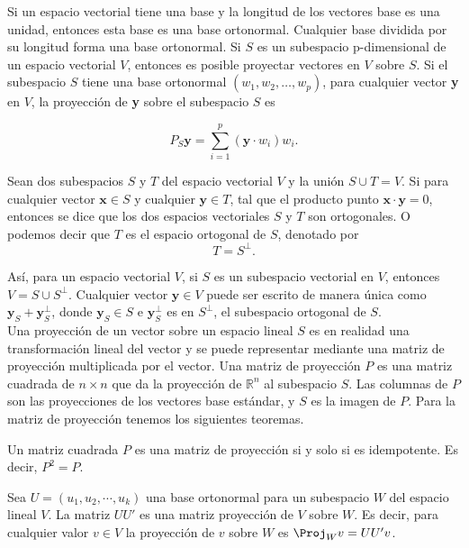 Si un espacio vectorial tiene una base y la longitud de los vectores base es una unidad, entonces esta base es una base ortonormal. Cualquier base dividida por su longitud forma una base ortonormal. Si $S$ es un subespacio p-dimensional de un espacio vectorial $V$, entonces es posible proyectar vectores en $V$ sobre $S$. Si el subespacio $S$ tiene una base ortonormal $(w_1, w_2, \ldots , w_p)$, para cualquier vector \textbf{y} en $V$, la proyección de \textbf{y} sobre el subespacio $S$ es

\begin{equation}
    P_{S}\textbf{y}=\sum_{i=1}^p (\textbf{y}\cdot w_i)w_i.
\end{equation}

Sean dos subespacios $S$ y $T$ del espacio vectorial $V$ y la unión $S\cup T = V$. Si para cualquier vector $\textbf{x}\in S$ y cualquier $\textbf{y}\in T$, tal que el producto punto $\textbf{x}\cdot \textbf{y}=0$, entonces se dice que los dos espacios vectoriales $S$ y $T$ son ortogonales. O podemos decir que $T$ es el espacio ortogonal de $S$, denotado por 
$$T=S^{\perp}.$$

Así, para un espacio vectorial $V$, si $S$ es un subespacio vectorial en $V$, entonces $V=S\cup S^{\perp}$. Cualquier vector $\textbf{y}\in V$ puede ser escrito de manera única como $\textbf{y}_{S}+\textbf{y}_S^{\perp}$, donde $\textbf{y}_S\in S$ e $\textbf{y}_S^{\perp}$ es en $S^{\perp}$, el subespacio ortogonal de $S$.\\

Una proyección de un vector sobre un espacio lineal $S$ es en realidad una transformación lineal del vector y se puede representar mediante una matriz de proyección multiplicada por el vector. Una matriz de proyección $P$ es una matriz cuadrada de $n \times n$ que da la proyección de $\mathbb{R}^n$ al subespacio $S$. Las columnas de $P$ son las proyecciones de los vectores base estándar, y $S$ es la imagen de $P$. Para la matriz de proyección tenemos los siguientes teoremas.

\begin{teo}
    Un matriz cuadrada $P$ es una matriz de proyección si y solo si es idempotente. Es decir, $P^2=P$.
\end{teo}

\begin{teo}
    Sea $U=(u_1,u_2,\cdots , u_k)$ una base ortonormal para un subespacio $W$ del espacio lineal $V$. La matriz $UU'$ es una matriz proyección de $V$ sobre $W$. Es decir, para cualquier valor $v\in V$ la proyección  de $v$ sobre $W$ es $\Proj_W v=UU'v$.
\end{teo}


